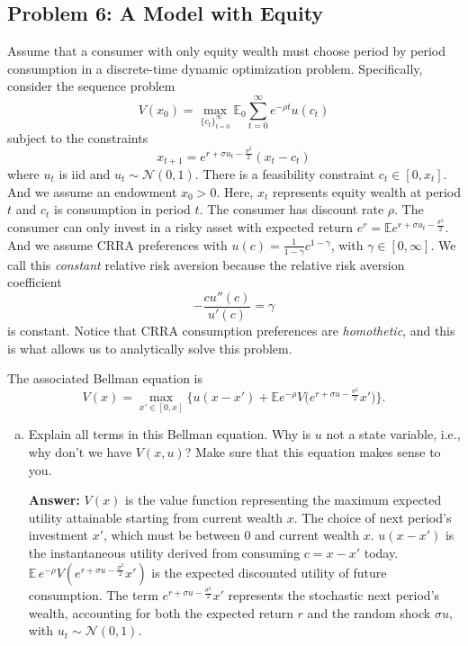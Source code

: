 \documentclass[11pt]{extarticle}
\theoremstyle{plain}
\theoremstyle{definition}
\begin{document}
\begin{enumerate}[(a)]
\section*{Problem 6: A Model with Equity}

\vspace{5mm}
\noindent
Assume that a consumer with only equity wealth must choose period by period consumption in a discrete-time dynamic optimization problem. Specifically, consider the sequence problem
\begin{equation*}
	V(x_0) = \max_{ \{ c_t \}_{t=0}^\infty } \mathbb E_0 \sum_{t=0}^\infty e^{- \rho t} u(c_t)
\end{equation*}
subject to the constraints
\begin{equation*}
	x_{t+1} = e^{r + \sigma u_t - \frac{\sigma^2}{2}} (x_t - c_t)
\end{equation*}
where $u_t$ is iid and $u_t \sim \mathcal N(0, 1)$. There is a feasibility constraint $c_t \in [0, x_t]$. And we assume an endowment $x_0 > 0$. Here, $x_t$ represents equity wealth at period $t$ and $c_t$ is consumption in period $t$. The consumer has discount rate $\rho$. The consumer can only invest in a risky asset with expected return $e^r = \mathbb E e^{r + \sigma u_t - \frac{\sigma^2}{2}}$. And we assume CRRA preferences with $u(c) = \frac{1}{1-\gamma} c^{1-\gamma}$, with $\gamma \in [0, \infty]$. We call this \textit{constant} relative risk aversion because the relative risk aversion coefficient
\begin{equation*}
	- \frac{c u''(c)}{u'(c)} = \gamma
\end{equation*}
is constant. Notice that CRRA consumption preferences are \textit{homothetic}, and this is what allows us to analytically solve this problem. 

The associated Bellman equation is 
\begin{equation*}
	V(x) = \max_{x' \in [0, x]} \bigg\{ u(x - x') + \mathbb E e^{- \rho} V \bigg( e^{r + \sigma u - \frac{\sigma^2}{2}} x' \bigg) \bigg\}.
\end{equation*}


\begin{enumerate}[(a)]
\item Explain all terms in this Bellman equation. Why is $u$ not a state variable, i.e., why don't we have $V(x, u)$? Make sure that this equation makes sense to you.

\textbf{Answer:} \(V(x)\) is the value function representing the maximum expected utility attainable starting from current wealth \(x\). The choice of next period's investment \(x'\), which must be between 0 and current wealth \(x\). \(u(x - x')\) is the instantaneous utility derived from consuming \(c = x - x'\) today. \(\mathbb{E} \, e^{-\rho} V\left(e^{r + \sigma u - \frac{\sigma^2}{2}} x'\right)\) is the expected discounted utility of future consumption. The term \(e^{r + \sigma u - \frac{\sigma^2}{2}} x'\) represents the stochastic next period's wealth, accounting for both the expected return \(r\) and the random shock \(\sigma u\), with \(u_t \sim \mathcal{N}(0, 1)\).


\end{enumerate}
\end{enumerate}
\end{document}
